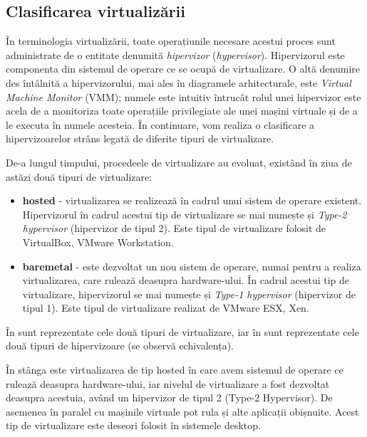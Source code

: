\subsection{Clasificarea virtualizării}
\label{sec:vm:concepts:class}

În terminologia virtualizării, toate operațiunile necesare acestui proces sunt
administrate de o entitate denumită \textit{hipervizor} (\textit{hypervisor}). Hipervizorul este componenta din sistemul de operare ce se ocupă de
virtualizare. O altă denumire des întâlnită a hipervizorului, mai ales în
diagramele arhitecturale, este \textit{Virtual Machine Monitor}
(VMM); numele este intuitiv întrucât rolul
unei hipervizor este acela de a monitoriza toate operațiile privilegiate ale
unei mașini virtuale și de a le executa în numele acesteia. În
continuare, vom realiza o clasificare a hipervizoarelor strâns legată de
diferite tipuri de virtualizare.

De-a lungul timpului, procedeele de virtualizare au evoluat, existând în ziua de
astăzi două tipuri de virtualizare:

\begin{itemize}
  \item \textbf{hosted} - virtualizarea se realizează în cadrul unui sistem de
		operare existent. Hipervizorul în cadrul acestui tip de
		virtualizare se mai numește și \textit{Type-2 hypervisor}
		(hipervizor de tipul 2). Este tipul de virtualizare folosit de VirtualBox, VMware Workstation.
  \item \textbf{baremetal} - este dezvoltat un nou sistem de operare, numai pentru
		a realiza virtualizarea, care rulează deasupra hardware-ului.
		În cadrul acestui tip de virtualizare, hipervizorul se mai
		numește și \textit{Type-1 hypervisor} (hipervizor de tipul 1). Este tipul de virtualizare realizat de VMware ESX, Xen.
\end{itemize}

În  sunt reprezentate cele două tipuri
de virtualizare, iar în  sunt
reprezentate cele două tipuri de hipervizoare (se observă echivalența).

În stânga este
virtualizarea de tip hosted în care avem sistemul de operare ce rulează deasupra
hardware-ului, iar nivelul de virtualizare a fost dezvoltat deasupra acestuia,
având un hipervizor de tipul 2 (Type-2 Hypervisor). De asemenea în paralel cu
mașinile virtuale pot rula și alte aplicații obișnuite. Acest tip de
virtualizare este deseori folosit în sistemele desktop.


